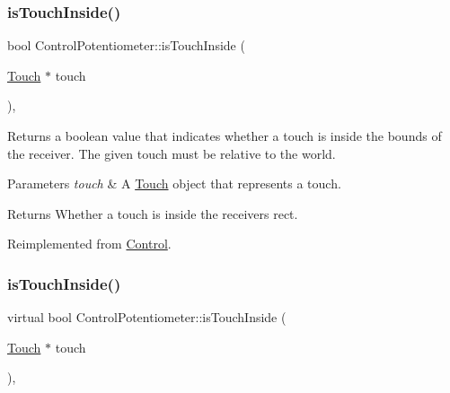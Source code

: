 \subsubsection{\texorpdfstring{is\+Touch\+Inside()}{isTouchInside()}\hspace{0.1cm}{\footnotesize\ttfamily [1/2]}}
{\footnotesize\ttfamily bool Control\+Potentiometer\+::is\+Touch\+Inside (\begin{DoxyParamCaption}\item[{\hyperlink{classTouch}{Touch} $\ast$}]{touch }\end{DoxyParamCaption})\hspace{0.3cm}{\ttfamily [override]}, {\ttfamily [virtual]}}

Returns a boolean value that indicates whether a touch is inside the bounds of the receiver. The given touch must be relative to the world.


\begin{DoxyParams}{Parameters}
{\em touch} & A \hyperlink{classTouch}{Touch} object that represents a touch.\\
\hline
\end{DoxyParams}
\begin{DoxyReturn}{Returns}
Whether a touch is inside the receiver\textquotesingle{}s rect. 
\end{DoxyReturn}


Reimplemented from \hyperlink{classControl_a897865e3e4ff50ed827f33966e786c7f}{Control}.

\mbox{\label{classControlPotentiometer_aa2bdcab40a678f249ee083c466064795}} 
\subsubsection{\texorpdfstring{is\+Touch\+Inside()}{isTouchInside()}\hspace{0.1cm}{\footnotesize\ttfamily [2/2]}}
{\footnotesize\ttfamily virtual bool Control\+Potentiometer\+::is\+Touch\+Inside (\begin{DoxyParamCaption}\item[{\hyperlink{classTouch}{Touch} $\ast$}]{touch }\end{DoxyParamCaption})\hspace{0.3cm}{\ttfamily [override]}, {\ttfamily [virtual]}}

